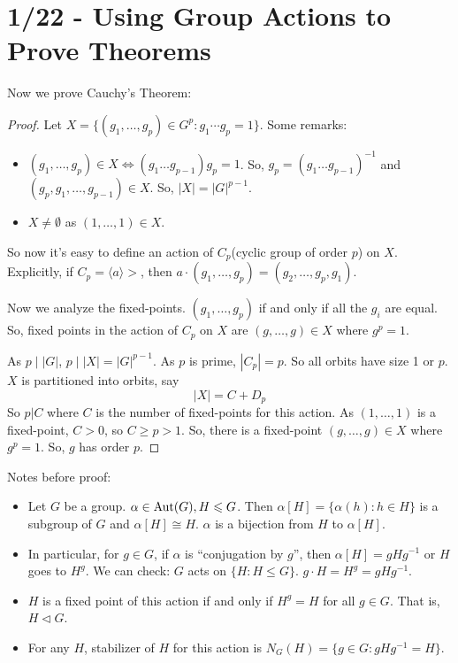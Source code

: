 \documentclass{report}
\begin{document}
\section{1/22 - Using Group Actions to Prove Theorems}
Now we prove Cauchy's Theorem:
\begin{proof}
    Let $X = \{ (g_1, \ldots, g_p) \in G^p : g_1 \cdots g_p = 1\}$. Some remarks:
    \begin{itemize}
        \item $(g_1, \ldots, g_p) \in X \iff (g_1\ldots g_{p-1})g_p = 1$. So, $g_p = (g_1\ldots g_{p-1})^{-1}$ and $(g_p, g_1, \ldots, g_{p-1}) \in X$. So, $|X| = |G|^{p-1}$.
        \item $X \neq \emptyset$ as $(1, \ldots, 1) \in X$.
    \end{itemize}
    So now it's easy to define an action of $C_p$(cyclic group of order $p$) on $X$. Explicitly, if $C_p = \langle a \rangle>$, then $a \cdot (g_1, \ldots, g_p) = (g_2, \ldots, g_p, g_1)$. 

    Now we analyze the fixed-points. $(g_1, \ldots, g_p)$ if and only if all the $g_i$ are equal. So, fixed points in the action of $C_p$ on $X$ are $(g, \ldots, g) \in X$ where $g^p = 1$. 

    As $p \mid |G|$, $p \mid |X| = |G|^{p-1}$. As $p$ is prime, $|C_p| = p$. So all orbits have size 1 or $p$. $X$ is partitioned into orbits, say $$|X| = C + D_p$$
    So $p | C$ where $C$ is the number of fixed-points for this action. As $(1, \ldots, 1)$ is a fixed-point, $C>0$, so $C \geq p > 1$. So, there is a fixed-point $(g, \ldots, g) \in X$ where $g^p = 1$. So, $g$ has order $p$.
\end{proof}
\noindent Notes before proof:
\begin{itemize}
    \item Let $G$ be a group. $\alpha \in \operatorname{Aut}(G), H\leqslant G$. Then $\alpha [H] = \{\alpha(h) : h \in H\}$ is a subgroup of $G$  and $\alpha[H] \cong H$. $\alpha$ is a bijection from $H$ to $\alpha[H]$. 
    \item In particular, for $g \in G$, if $\alpha$ is ``conjugation by $g$'', then $\alpha[H] = gHg^{-1}$ or $H$ goes to $H^g$. We can check: $G$ acts on $\{H : H \leq G\}$. $g\cdot H = H^g = gHg^{-1}$.
    \item $H$ is a fixed point of this action if and only if $H^g = H$ for all $g \in G$. That is, $H \lhd G$.
    \item For any $H$, stabilizer of $H$ for this action is $N_G(H) = \{g \in G : gHg^{-1} = H\}$.
\end{itemize}
\end{document}
